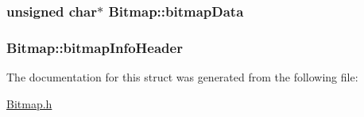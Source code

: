 \subsubsection[{\texorpdfstring{bitmap\+Data}{bitmapData}}]{\setlength{\rightskip}{0pt plus 5cm}unsigned char$\ast$ Bitmap\+::bitmap\+Data}\hypertarget{structBitmap_a581eac36ec50d730299b6df60e644750}{}\label{structBitmap_a581eac36ec50d730299b6df60e644750}
\subsubsection[{\texorpdfstring{bitmap\+Info\+Header}{bitmapInfoHeader}}]{ Bitmap\+::bitmap\+Info\+Header}\hypertarget{structBitmap_a95c481a5ce1ff4af08cd135ca4af120b}{}\label{structBitmap_a95c481a5ce1ff4af08cd135ca4af120b}


The documentation for this struct was generated from the following file\+:\begin{DoxyCompactItemize}
\item 
\hyperlink{Bitmap_8h}{Bitmap.\+h}\end{DoxyCompactItemize}
